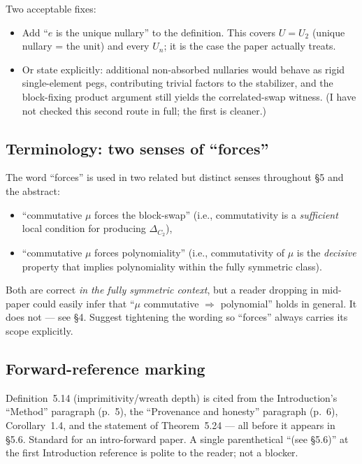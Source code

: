 \documentclass[11pt]{article}
\begin{document}
Two acceptable fixes:
\begin{itemize}[leftmargin=1.5em, itemsep=1pt]
  \item Add ``$e$ is the unique nullary'' to the definition. This covers $U = U_2$ (unique nullary = the unit) and every $U_n$; it is the case the paper actually treats.
  \item Or state explicitly: additional non-absorbed nullaries would behave as rigid single-element pegs, contributing trivial factors to the stabilizer, and the block-fixing product argument still yields the correlated-swap witness. (I have not checked this second route in full; the first is cleaner.)
\end{itemize}

\subsection{Terminology: two senses of ``forces''}

The word ``forces'' is used in two related but distinct senses throughout §5 and the abstract:
\begin{itemize}[leftmargin=1.5em, itemsep=1pt]
  \item ``commutative $\mu$ forces the block-swap'' (i.e., commutativity is a \emph{sufficient} local condition for producing $\Delta_{C_2}$),
  \item ``commutative $\mu$ forces polynomiality'' (i.e., commutativity of $\mu$ is the \emph{decisive} property that implies polynomiality within the fully symmetric class).
\end{itemize}
Both are correct \emph{in the fully symmetric context}, but a reader dropping in mid-paper could easily infer that ``$\mu$ commutative $\Rightarrow$ polynomial'' holds in general. It does not — see §4. Suggest tightening the wording so ``forces'' always carries its scope explicitly.

\subsection{Forward-reference marking}

Definition~5.14 (imprimitivity/wreath depth) is cited from the Introduction's ``Method'' paragraph (p.~5), the ``Provenance and honesty'' paragraph (p.~6), Corollary~1.4, and the statement of Theorem~5.24 — all before it appears in §5.6. Standard for an intro-forward paper. A single parenthetical ``(see §5.6)'' at the first Introduction reference is polite to the reader; not a blocker.
\end{document}
